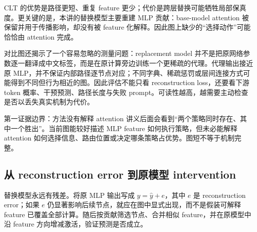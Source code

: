 

CLT 的优势是路径更短、重复 feature 更少；代价是跨层替换可能牺牲局部保真度。更关键的是，本讲的替换模型主要重建 MLP 贡献：base-model attention 被保留并用于传播影响，却没有被 feature 化解释。因此图上缺少的“选择动作”可能恰恰由 attention 完成。

对比图还揭示了一个容易忽略的测量问题：replacement model 并不是把原网络参数逐一翻译成中文标签，而是在原计算旁边训练一个更稀疏的代理。代理输出接近原 MLP，并不保证内部路径逐节点对应；不同字典、稀疏惩罚或层间连接方式可能得到不同但行为相近的图。因此评估不能只看 reconstruction loss，还要看下游 token 概率、干预预测、路径长度与失败 prompt。可读性越高，越需要主动检查是否以丢失真实机制为代价。

\begin{warningbox}{第一证据边界：方法没有解释 attention}
讲义后面会看到“两个策略同时存在、其中一个胜出”。当前图能较好描述 MLP feature 如何执行策略，但未必能解释 attention 如何选择信息、路由位置或决定哪条策略占优势。图短不等于机制完整。
\end{warningbox}


\subsection{从 reconstruction error 到原模型 intervention}

替换模型永远有残差。将原 MLP 输出写成 $y=\hat y+e$，其中 $e$ 是 reconstruction error；如果 $e$ 仍显著影响后续节点，就应在图中显式出现，而不是假装可解释 feature 已覆盖全部计算。随后按贡献筛选节点、合并相似 feature，并在原模型中沿 feature 方向增减激活，验证预测是否成立。





